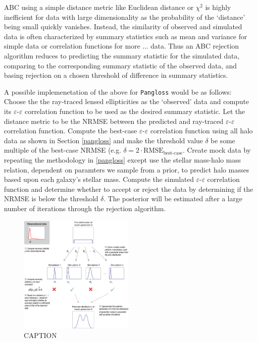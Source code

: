 \documentclass[%
 reprint,
 amsmath,amssymb,
 aps,nofootinbib
]{revtex4-1}
\begin{document}
ABC using a simple distance metric like Euclidean distance or $\chi^2$ is highly inefficient for data with large dimensionality as the probability of the `distance' being small quickly vanishes. Instead, the similarity of observed and simulated data is often characterized by summary statistics such as mean and variance for simple data or correlation functions for more ... data. Thus an ABC rejection algorithm reduces to predicting the summary statistic for the simulated data, comparing to the corresponding summary statistic of the observed data, and basing rejection on a chosen threshold of difference in summary statistics.

A possible implemenetation of the above for \texttt{Pangloss} would be as follows: Choose the the ray-traced lensed ellipticities as the `observed' data and compute its $\varepsilon$-$\varepsilon$ correlation function to be used as the desired summary statistic. Let the distance metric to be the NRMSE between the predicted and ray-traced $\varepsilon$-$\varepsilon$ correlation function. Compute the best-case $\varepsilon$-$\varepsilon$ correlation function using all halo data as shown in Section \ref{pangloss} and make the threshold value $\delta$ be some multiple of the best-case NRMSE (e.g. ${\delta=2\cdot\text{RMSE}_{\text{best-case}}}$. Create mock data by repeating the methodology in \ref{pangloss} except use the stellar mass-halo mass relation, dependent on paramters we sample from a prior, to predict halo masses based upon each galaxy's stellar mass. Compute the simulated $\varepsilon$-$\varepsilon$ correlation function and determine whether to accept or reject the data by determining if the NRMSE is below the threshold $\delta$. The posterior will be estimated after a large number of iterations through the rejection algorithm.

\begin{figure}
    \centering
    \includegraphics[width=0.5\textwidth]{figs-swe/thesis/abc.png}
    \captionsetup{justification=raggedright,singlelinecheck=false}
    \caption{CAPTION}
    \label{fig:abc}
\end{figure}
\end{document}
